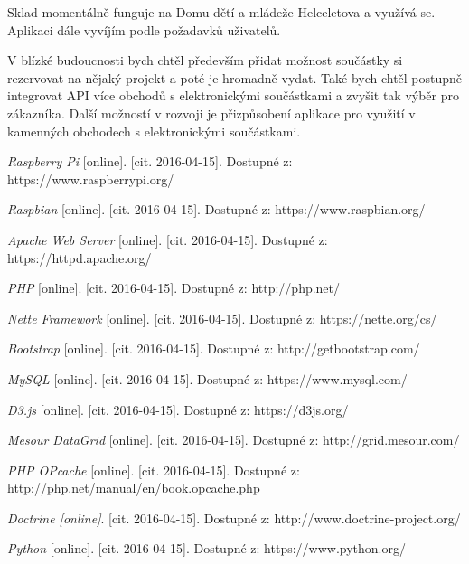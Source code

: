 \documentclass[12pt, a4paper, oneside]{article}
\begin{document}
Sklad momentálně funguje na Domu dětí a mládeže Helceletova a využívá se. Aplikaci dále vyvíjím podle požadavků uživatelů.

V blízké budoucnosti bych chtěl především přidat možnost součástky si rezervovat na nějaký projekt a poté je hromadně vydat. Také bych chtěl postupně integrovat API více obchodů s elektronickými součástkami a zvyšit tak výběr pro zákazníka. Další možností v rozvoji je přizpůsobení aplikace pro využití v kamenných obchodech s elektronickými součástkami.


\newpage

\begin{thebibliography}{99}

\emph{Raspberry Pi} [online]. [cit. 2016-04-15]. Dostupné z: https://www.raspberrypi.org/


\emph{Raspbian} [online]. [cit. 2016-04-15]. Dostupné z: https://www.raspbian.org/


\emph{Apache Web Server} [online]. [cit. 2016-04-15]. Dostupné z: https://httpd.apache.org/


\emph{PHP} [online]. [cit. 2016-04-15]. Dostupné z: http://php.net/


\emph{Nette Framework} [online]. [cit. 2016-04-15]. Dostupné z: https://nette.org/cs/


\emph{Bootstrap} [online]. [cit. 2016-04-15]. Dostupné z: http://getbootstrap.com/


\emph{MySQL} [online]. [cit. 2016-04-15]. Dostupné z: https://www.mysql.com/


\emph{D3.js} [online]. [cit. 2016-04-15]. Dostupné z: https://d3js.org/


\emph{Mesour DataGrid} [online]. [cit. 2016-04-15]. Dostupné z: http://grid.mesour.com/


\emph{PHP OPcache} [online]. [cit. 2016-04-15]. Dostupné z: http://php.net/manual/en/book.opcache.php


\emph{Doctrine [online]}. [cit. 2016-04-15]. Dostupné z: http://www.doctrine-project.org/


\emph{Python} [online]. [cit. 2016-04-15]. Dostupné z: https://www.python.org/

\end{thebibliography}

\newpage
\newpage
\end{document}
